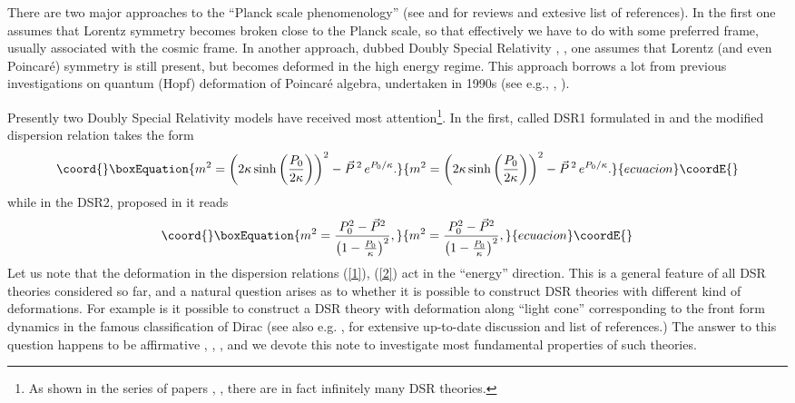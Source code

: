 \documentclass [12pt]  {article}
\begin{document}
There are two major approaches to the ``Planck scale
phenomenology'' (see \cite{Amelino-Camelia:2002ar} and
\cite{Amelino-Camelia:2002fw} for reviews and extesive list of
references). In the first one assumes that Lorentz symmetry
becomes broken close to the Planck scale, so that effectively we
have to do with some preferred frame, usually associated with the
cosmic frame. In another approach, dubbed Doubly Special
Relativity \cite{Amelino-Camelia:2000mn},
\cite{Amelino-Camelia:2000ge}, one assumes that Lorentz (and even
Poincar\'e) symmetry is still present, but becomes deformed in the
high energy regime. This approach borrows a lot from previous
investigations on quantum (Hopf) deformation of Poincar\'e
algebra, undertaken in 1990s (see e.g., \cite{lunoruto},
\cite{maru}).

Presently two Doubly Special Relativity models have received most
attention\footnote{As shown in the series of papers
\cite{Kowalski-Glikman:2002ft}, \cite{Kowalski-Glikman:2002jr},
 \cite{Kowalski-Glikman:2002we} there are in fact infinitely many DSR
theories.}. In the first, called DSR1  formulated in
\cite{Kowalski-Glikman:2001gp} and \cite{Bruno:2001mw} the
modified dispersion relation takes the form
\begin{equation}\coord{}\boxEquation{\label{1}
 m^2 = \left(2\kappa \sinh \left(\frac{P_0}{2\kappa}\right)\right)^2 - \vec{P}\,{}^2\, e^{P_0/\kappa}.
}{m^2 = \left(2\kappa \sinh \left(\frac{P_0}{2\kappa}\right)\right)^2 - \vec{P}\,{}^2\, e^{P_0/\kappa}.
}{ecuacion}\coordE{}\end{equation}
while in the DSR2, proposed in \cite{Magueijo:2001cr} it reads
\begin{equation}\coord{}\boxEquation{\label{2}
 m^2 = \frac{P_{0}^2 - \vec{P}{}^2}{\left(1- \frac{P_0}\kappa\right)^2},
}{m^2 = \frac{P_{0}^2 - \vec{P}{}^2}{\left(1- \frac{P_0}\kappa\right)^2},
}{ecuacion}\coordE{}\end{equation}
Let us note that the deformation in the dispersion relations
(\ref{1}), (\ref{2}) act in the ``energy'' direction. This is a
general feature of all DSR theories considered so far, and a
natural question arises as to whether it is possible to construct
DSR theories with different kind of deformations. For example is
it possible to construct a DSR theory with deformation along
``light cone'' corresponding to the front form dynamics in the
famous classification of Dirac \cite{Dirac1949} (see also e.g.
\cite{Leutwyler1978}, \cite{Heinzl2000} for extensive up-to-date
discussion and list of references.) The answer to this question
happens to be affirmative \cite{Ballesteros:mi},
\cite{kosinski1995},  \cite{przanowski1996},
\cite{Lukierski:2002ii} and we devote this note to investigate
most fundamental properties of such theories.
\end{document}
